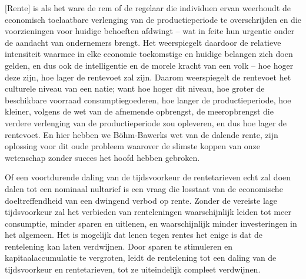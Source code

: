 \begin{blockquotebox}
    {[}Rente{]} is als het ware de rem of de regelaar die individuen ervan weerhoudt de economisch toelaatbare verlenging van de productieperiode te overschrijden en die voorzieningen voor huidige behoeften afdwingt -- wat in feite hun urgentie onder de aandacht van ondernemers brengt. Het weerspiegelt daardoor de relatieve intensiteit waarmee in elke economie toekomstige en huidige belangen zich doen gelden, en dus ook de intelligentie en de morele kracht van een volk -- hoe hoger deze zijn, hoe lager de rentevoet zal zijn. Daarom weerspiegelt de rentevoet het culturele niveau van een natie; want hoe hoger dit niveau, hoe groter de beschikbare voorraad consumptiegoederen, hoe langer de productieperiode, hoe kleiner, volgens de wet van de afnemende opbrengst, de meeropbrengst die verdere verlenging van de productieperiode zou opleveren, en dus hoe lager de rentevoet. En hier hebben we Böhm-Bawerk\textquotesingle s wet van de dalende rente, zijn oplossing voor dit oude probleem waarover de slimste koppen van onze wetenschap zonder succes het hoofd hebben gebroken.\footnotemark
\end{blockquotebox}
\autocite{165}

Of een voortdurende daling van de tijdsvoorkeur de rentetarieven echt zal doen dalen tot een nominaal nultarief is een vraag die losstaat van de economische doeltreffendheid van een dwingend verbod op rente. Zonder de vereiste lage tijdsvoorkeur zal het verbieden van renteleningen waarschijnlijk leiden tot meer consumptie, minder sparen en uitlenen, en waarschijnlijk minder investeringen in het algemeen. Het is mogelijk dat lenen tegen rentes het enige is dat de rentelening kan laten verdwijnen. Door sparen te stimuleren en kapitaalaccumulatie te vergroten, leidt de rentelening tot een daling van de tijdsvoorkeur en rentetarieven, tot ze uiteindelijk compleet verdwijnen.
